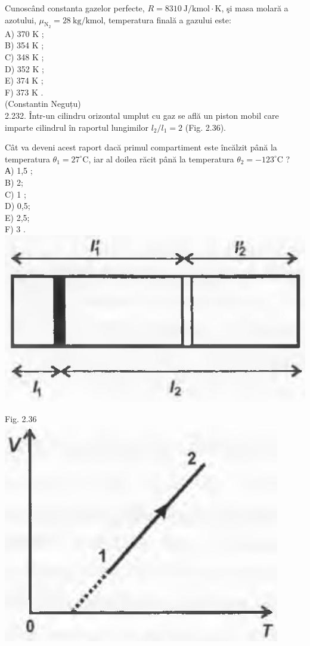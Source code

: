 \documentclass[10pt]{article}
\begin{document}
Cunoscând constanta gazelor perfecte, $R=8310 \mathrm{~J} / \mathrm{kmol} \cdot \mathrm{K}$, şi masa molară a azotului, $\mu_{\mathrm{N}_{2}}=28 \mathrm{~kg} / \mathrm{kmol}$, temperatura finală a gazului este:\\
A) 370 K ;\\
B) 354 K ;\\
C) 348 K ;\\
D) 352 K ;\\
E) 374 K ;\\
F) 373 K .\\
(Constantin Neguțu)\\
2.232. Într-un cilindru orizontal umplut cu gaz se află un piston mobil care imparte cilindrul în raportul lungimilor $l_{2} / l_{1}=2$ (Fig. 2.36).

Cât va deveni acest raport dacă primul compartiment este încălzit până la temperatura $\theta_{1}=27^{\circ} \mathrm{C}$, iar al doilea răcit până la temperatura $\theta_{2}=-123^{\circ} \mathrm{C}$ ?\\
А) 1,5 ;\\
B) 2;\\
C) 1 ;\\
D) 0,5;\\
E) 2,5;\\
F) 3 .\\
\includegraphics[max width=\textwidth, center]{2025_07_01_5b3ff9fa0d508c8e9f17g-126(1)}

Fig. 2.36\\
\includegraphics[max width=\textwidth, center]{2025_07_01_5b3ff9fa0d508c8e9f17g-126}
\end{document}
